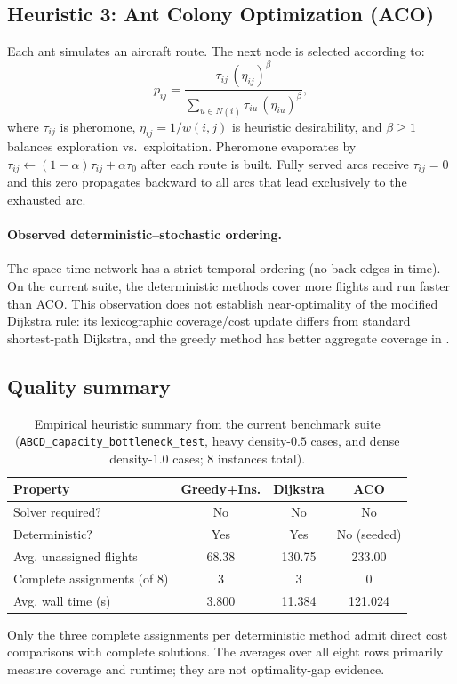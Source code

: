 \subsection{Heuristic 3: Ant Colony Optimization (ACO)}

Each ant simulates an aircraft route.  The next node is selected according to:
\begin{equation}
  p_{ij} = \frac{\tau_{ij}\,(\eta_{ij})^\beta}
  {\displaystyle\sum_{u \in N(i)} \tau_{iu}\,(\eta_{iu})^\beta},
\end{equation}
where $\tau_{ij}$ is pheromone, $\eta_{ij} = 1/w(i,j)$ is heuristic
desirability, and $\beta \ge 1$ balances exploration vs.\ exploitation.
Pheromone evaporates by $\tau_{ij} \leftarrow (1-\alpha)\tau_{ij} +
\alpha\tau_0$ after each route is built.  Fully served arcs receive
$\tau_{ij} = 0$ and this zero propagates backward to all arcs that lead
exclusively to the exhausted arc.

\paragraph{Observed deterministic--stochastic ordering.}
The space-time network has a strict temporal ordering (no back-edges in time).
On the current suite, the deterministic methods cover more flights and run
faster than ACO. This observation does not establish near-optimality of the
modified Dijkstra rule: its lexicographic coverage/cost update differs from
standard shortest-path Dijkstra, and the greedy method has better aggregate
coverage in .

\subsection{Quality summary}

\begin{table}[t]
\centering\small
\caption{Empirical heuristic summary from the current benchmark suite
  (\texttt{ABCD\_capacity\_bottleneck\_test}, heavy density-$0.5$ cases,
  and dense density-$1.0$ cases; 8 instances total).}
\label{tab:heuristic_comparison}
\begin{tabular}{lccc}
\toprule
Property & Greedy+Ins. & Dijkstra & ACO \\
\midrule
Solver required? & No  & No  & No \\
Deterministic?   & Yes & Yes & No (seeded) \\
Avg. unassigned flights & 68.38 & 130.75 & 233.00 \\
Complete assignments (of 8) & 3 & 3 & 0 \\
Avg. wall time (s) & 3.800 & 11.384 & 121.024 \\
\bottomrule
\end{tabular}
\end{table}

Only the three complete assignments per deterministic method admit direct
cost comparisons with complete solutions. The averages over all eight rows
primarily measure coverage and runtime; they are not optimality-gap evidence.
